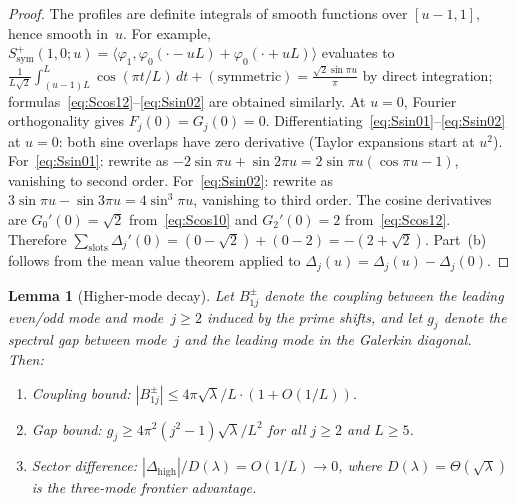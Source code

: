 \documentclass[11pt,a4paper]{article}
\newtheorem{lemma}[lemma]{Lemma}
\theoremstyle{remark}
\theoremstyle{plain}
\begin{document}
\begin{proof}
The profiles are definite integrals of smooth functions over
$[u-1,1]$, hence smooth in~$u$. For example,
$S^+_{\mathrm{sym}}(1,0;u)=\langle\varphi_1,\varphi_0(\cdot-uL)+\varphi_0(\cdot+uL)\rangle$
evaluates to $\frac{1}{L\sqrt{2}}\int_{(u-1)L}^{L}\cos(\pi t/L)\,dt + (\text{symmetric})
=\frac{\sqrt{2}\sin\pi u}{\pi}$
by direct integration; formulas~\eqref{eq:Scos12}--\eqref{eq:Ssin02} are obtained
similarly. At $u=0$, Fourier orthogonality gives $F_j(0)=G_j(0)=0$.
Differentiating~\eqref{eq:Ssin01}--\eqref{eq:Ssin02} at $u=0$: both sine
overlaps have zero derivative (Taylor expansions start at $u^2$).
For~\eqref{eq:Ssin01}: rewrite as
$-2\sin\pi u+\sin 2\pi u = 2\sin\pi u(\cos\pi u-1)$, vanishing to second order.
For~\eqref{eq:Ssin02}: rewrite as
$3\sin\pi u-\sin 3\pi u = 4\sin^3\pi u$, vanishing to third order.
The cosine derivatives are
$G_0'(0)=\sqrt{2}$ from~\eqref{eq:Scos10}
and $G_2'(0)=2$ from~\eqref{eq:Scos12}.
Therefore
$\sum_{\mathrm{slots}}\Delta_j'(0)=(0-\sqrt{2})+(0-2)=-(2+\sqrt{2})$.
Part~(b) follows from the mean value theorem applied to
$\Delta_j(u)=\Delta_j(u)-\Delta_j(0)$.
\end{proof}

\begin{lemma}[Higher-mode decay]
\label{lem:higher-mode}
Let $B_{1j}^\pm$ denote the coupling between the leading even/odd mode and
mode~$j\geq 2$ induced by the prime shifts, and let $g_j$ denote the spectral gap
between mode~$j$ and the leading mode in the Galerkin diagonal. Then:
\begin{enumerate}[label=(\roman*)]
  \item \emph{Coupling bound:}
  $|B_{1j}^\pm|\leq 4\pi\sqrt\lambda/L\cdot(1+O(1/L))$.
  \item \emph{Gap bound:}
  $g_j\geq 4\pi^2(j^2-1)\sqrt\lambda/L^2$ for all $j\geq 2$ and $L\geq 5$.
  \item \emph{Sector difference:}
  $|\Delta_{\mathrm{high}}|/D(\lambda)=O(1/L)\to 0$, where $D(\lambda)=\Theta(\sqrt\lambda)$
  is the three-mode frontier advantage.
\end{enumerate}
\end{lemma}
\end{document}
